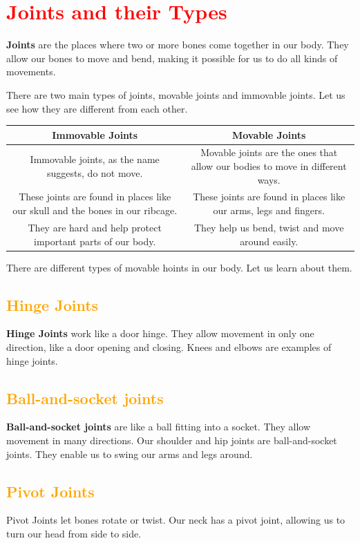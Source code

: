 \section{\textcolor{red}{Joints and their Types}}
\textbf{Joints} are the places where two or more bones come together in our body. They allow our bones to move and bend, making it possible for us to do all kinds of movements.
\vspace{0.1in}
\par
There are two main types of joints, movable joints and immovable joints. Let us see how they are different from each other.\\
\vspace{0.1in}
\begin{tabular}{|c|c|}
\centering
\hline
Immovable Joints & Movable Joints\\
\hline
Immovable joints, as the name suggests, do not move. & Movable joints are the ones that allow our bodies to move in different ways.\\
\hline
These joints are found in places like our skull and the bones in our ribcage. & These joints are found in places like our arms, legs and fingers.\\
\hline
They are hard and help protect important parts of our body. & They help us bend, twist and move around easily.
\hline
\end{tabular}
\vspace{0.1in}
\par
There are different types of movable hoints in our body. Let us learn about them.
\subsection{\textcolor{orange}{Hinge Joints}}
\textbf{Hinge Joints} work like a door hinge. They allow movement in only one direction, like a door opening and closing. Knees and elbows are examples of hinge joints.
\subsection{\textcolor{orange}{Ball-and-socket joints}}
\textbf{Ball-and-socket joints} are like a ball fitting into a socket. They allow movement in many directions. Our shoulder and hip joints are ball-and-socket joints. They enable us to swing our arms and legs around.
\subsection{\textcolor{orange}{Pivot Joints}}
Pivot Joints let bones rotate or twist. Our neck has a pivot joint, allowing us to turn our head from side to side.
